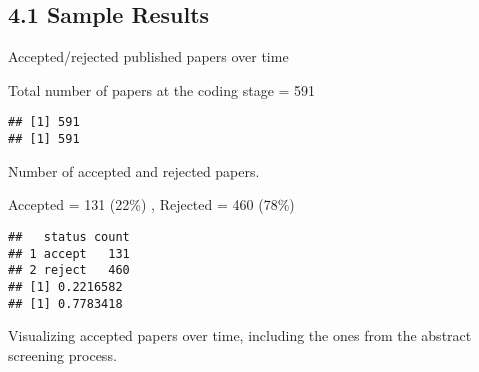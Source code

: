\documentclass[
]{article}
\newenvironment{Shaded}{\begin{snugshade}}{\end{snugshade}}
\newcommand{\CommentTok}[1]{\textcolor[rgb]{0.56,0.35,0.01}{\textit{#1}}}
\newcommand{\DataTypeTok}[1]{\textcolor[rgb]{0.13,0.29,0.53}{#1}}
\newcommand{\KeywordTok}[1]{\textcolor[rgb]{0.13,0.29,0.53}{\textbf{#1}}}
\newcommand{\NormalTok}[1]{#1}
\newcommand{\OperatorTok}[1]{\textcolor[rgb]{0.81,0.36,0.00}{\textbf{#1}}}
\newcommand{\StringTok}[1]{\textcolor[rgb]{0.31,0.60,0.02}{#1}}
\begin{document}
\hypertarget{sample-results}{%
\subsection{4.1 Sample Results}\label{sample-results}}

Accepted/rejected published papers over time

Total number of papers at the coding stage = 591

\begin{Shaded}
\end{Shaded}

\begin{verbatim}
## [1] 591
## [1] 591
\end{verbatim}

Number of accepted and rejected papers.

Accepted = 131 (22\%) , Rejected = 460 (78\%)

\begin{Shaded}
\end{Shaded}

\begin{verbatim}
##   status count
## 1 accept   131
## 2 reject   460
## [1] 0.2216582
## [1] 0.7783418
\end{verbatim}

Visualizing accepted papers over time, including the ones from the
abstract screening process.
\end{document}

